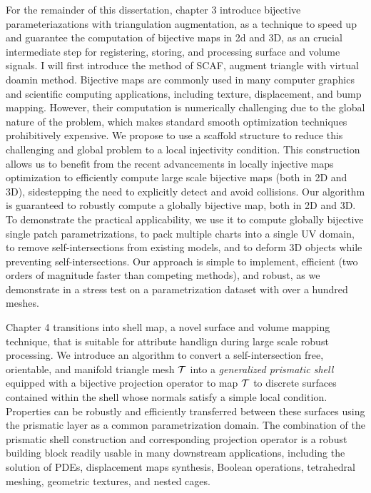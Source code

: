 For the remainder of this dissertation,
chapter 3 introduce bijective parameteriazations with triangulation augmentation, as a technique to speed up and guarantee the computation of bijective maps in 2d and 3D, as an crucial intermediate step for registering, storing, and processing surface and volume signals.
I will first introduce the method of SCAF, 
augment triangle with virtual doamin method.
Bijective maps are commonly used in many computer graphics and scientific computing applications, including texture, displacement, and bump mapping. However, their computation is numerically challenging due to the global nature of the problem, which makes standard smooth optimization techniques prohibitively expensive.
We propose to use a scaffold structure to reduce this challenging and global problem to a local injectivity condition. This construction allows us to benefit from the recent advancements in locally injective maps optimization to efficiently compute large scale bijective maps (both in 2D and 3D), sidestepping the need to explicitly detect and avoid collisions.
Our algorithm is guaranteed to robustly compute a globally bijective map, both in 2D and 3D. To demonstrate the practical applicability, we use it to compute globally bijective single patch parametrizations, to pack multiple charts into a single UV domain, to remove self-intersections from existing models, and to deform 3D objects while preventing self-intersections.
Our approach is simple to implement, efficient (two orders of magnitude faster than competing methods), and robust, as we demonstrate in a stress test on a parametrization dataset with over a hundred meshes.

Chapter 4 transitions into shell map, a novel surface and volume mapping technique, that is suitable for attribute handlign during large scale robust processing. 
We introduce an algorithm to convert a self-intersection free, orientable, and manifold triangle mesh $\mathcal{T}$ into a \emph{generalized prismatic shell} equipped with a bijective projection operator to map $\mathcal{T}$ to  discrete surfaces contained within the shell whose normals satisfy a simple local condition. Properties can be robustly and efficiently transferred between these surfaces using the prismatic layer as a common parametrization domain. 
The combination of the prismatic shell construction and corresponding projection operator is a robust building block readily usable in many downstream applications, including the solution of PDEs, displacement maps synthesis, Boolean operations, tetrahedral meshing, geometric textures, and nested cages.

